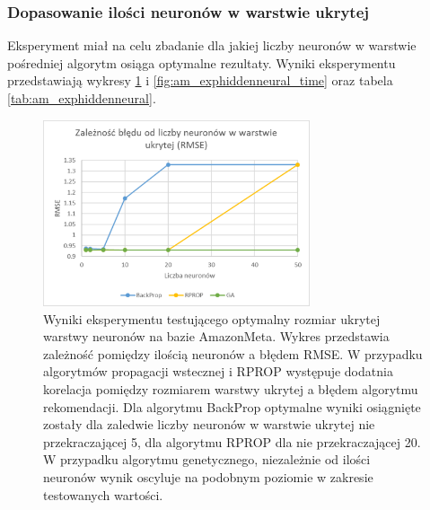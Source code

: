 \documentclass[twoside]{iisthesis}
\begin{document}
			
			\subsubsection{Dopasowanie ilości neuronów w warstwie ukrytej}
			
				Eksperyment miał na celu zbadanie dla jakiej liczby neuronów w warstwie pośredniej algorytm osiąga optymalne rezultaty. Wyniki eksperymentu przedstawiają wykresy \ref{fig:am_exphiddenneural_rmse} i \ref{fig:am_exphiddenneural_time} oraz tabela \ref{tab:am_exphiddenneural}. 
			
				\begin{figure}[H]
					\centering
					\includegraphics[width=0.7\textwidth]{am_exphiddenneural_rmse}
					\caption{Wyniki eksperymentu testującego optymalny rozmiar ukrytej warstwy neuronów na bazie AmazonMeta. Wykres przedstawia zależność pomiędzy ilością neuronów a błędem RMSE. W przypadku algorytmów propagacji wstecznej i RPROP występuje dodatnia korelacja pomiędzy rozmiarem warstwy ukrytej a błędem algorytmu rekomendacji. Dla algorytmu BackProp optymalne wyniki osiągnięte zostały dla zaledwie liczby neuronów w warstwie ukrytej nie przekraczającej 5, dla algorytmu RPROP dla nie przekraczającej 20. W przypadku algorytmu genetycznego, niezależnie od ilości neuronów wynik oscyluje na podobnym poziomie w zakresie testowanych wartości.}
					\label{fig:am_exphiddenneural_rmse}
				\end{figure}
				
\end{document}
